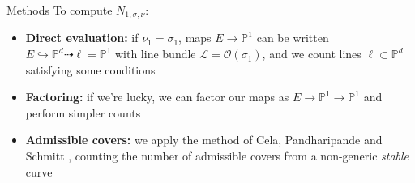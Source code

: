 \documentclass{beamer}
\renewcommand{\P}{\mathbb P}
\theoremstyle{definition}
\begin{document}
                                                                                                                                                                                                                          \begin{frame}{Methods}
                                                                                                                                                                                                                            To compute $N_{1,\sigma,\nu}$:
                                                                                                                                                                                                                            \begin{itemize}
                                                                                                                                                                                                                            \item {\bf Direct evaluation:} if $\nu_1=\sigma_1$, maps $E\to\P^1$ can be written $E\hookrightarrow\P^d\dashrightarrow \ell=\P^1$
                                                                                                                                                                                                                              with line bundle $\mathcal L=\mathcal O(\sigma_1)$,
                                                                                                                                                                                                                              and we count lines $\ell\subset\P^d$ satisfying some conditions
                                                                                                                                                                                                                            \item {\bf Factoring:} if we're lucky, we can factor our maps as $E\to\P^1\to\P^1$ and perform simpler counts
                                                                                                                                                                                                                            \item {\bf Admissible covers:} we apply the method of Cela, Pandharipande and Schmitt \cite{Cela}, counting the number of admissible covers from a non-generic
                                                                                                                                                                                                                              {\it stable} curve
                                                                                                                                                                                                                            \end{itemize}


\end{frame}
\end{document}
